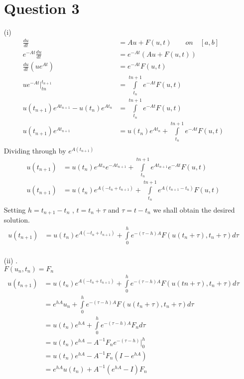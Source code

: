 \documentclass[12pt,a4paper]{article}
\begin{document}
\begin{itemize}
\section*{Question 3}
\item[(i)]
\begin{align*}
\frac{du}{dt}&=Au+F\left(u,t\right)   \quad \quad on \quad  [a,b]\\
e^{-At}\frac{du}{dt}&=e^{-At}\left(Au+F\left(u,t\right)\right)\\
\frac{du}{dt}\left(ue^{At}\right)&=e^{-At}F\left(u,t\right)\\
ue^{-At}|_{tn}^{t_{n+1}}&=\int\limits_{t_{n}}^{tn+1}e^{-At}F\left(u,t\right)\\
u(t_{n+1})e^{At_{n+1}}-u(t_{n})e^{At_{n}}&=\int\limits_{t_{n}}^{tn+1}e^{-At}F\left(u,t\right)\\
u(t_{n+1})e^{At_{n+1}}&=u(t_{n})e^{At_{n}}+\int\limits_{t_{n}}^{tn+1}e^{-At}F\left(u,t\right)\\
\end{align*}
Dividing through by $e^{A\left(t_{n+1}\right)}$
\begin{align*}
u(t_{n+1})&=u(t_{n})e^{At_{n}}e^{-At_{n+1}}+\int\limits_{t_{n}}^{tn+1}e^{At_{n+1}}e^{-At}F\left(u,t\right)\\
u(t_{n+1})&=u(t_{n})e^{A\left(-t_{n}+t_{n+1}\right)}+\int\limits_{t_{n}}^{tn+1}e^{A\left(t_{n+1}-t_{n}\right)}F\left(u,t\right)\\
\end{align*}
Setting $h=t_{n+1}-t_{n}$ , $t=t_{n}+\tau$ and $\tau=t-t_{n}$ we shall obtain the desired solution.\\

\begin{align*}
u(t_{n+1})&=u(t_{n}) e^{A(-t_{n}+t_{n+1})}+\int\limits_{0}^{h}e^{-(\tau-h)A}F(u(t_{n}+\tau),t_{n}+\tau)d\tau\\
\end{align*}
\newpage

\item[(ii)]
.\\
$F\left(u_{n},t_{n}\right)=F_{n}$
\begin{align*}
u(t_{n+1})&=u(t_{n})e^{A\left(-t_{n}+t_{n+1}\right)}+\int\limits_{0}^{h}e^{-\left(\tau-h\right)A}F\left(u\left(tn+\tau\right),t_{n}+\tau\right)d\tau\\
&=e^{hA}u_{n}+\int\limits_{0}^{h}e^{-\left(\tau-h\right)A}F(u(t_{n}+\tau),t_{n}+\tau)d\tau\\
&=u(t_{n})e^{hA}+\int\limits_{0}^{h}e^{-\left(\tau-h\right)A}F_{n}d\tau\\
&=u(t_{n})e^{hA}-A^{-1}F_{n}e^{-\left(\tau-h\right)}\lvert _{0}^{h}\\
&=u(t_{n})e^{hA}-A^{-1}F_{n}\left(I-e^{hA}\right)\\
&=e^{hA}u(t_{n})+A^{-1}\left(e^{hA}-I\right)F_{n}
\end{align*}
\end{itemize}
\end{document}
